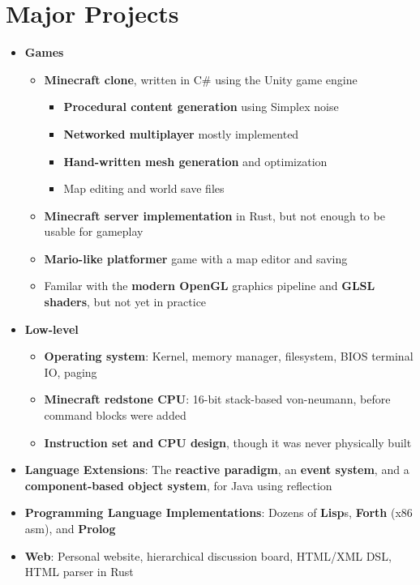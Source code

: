 \documentclass[11pt]{article}
\begin{document}
\section{Major Projects}
\begin{itemize}[noitemsep,nolistsep]
\item {\bf Games}
  \begin{itemize}[noitemsep,nolistsep]
  \item {\bf Minecraft clone}, written in C\# using the Unity game engine
    \begin{itemize}[noitemsep,nolistsep]
    \item {\bf Procedural content generation} using Simplex noise
    \item {\bf Networked multiplayer} mostly implemented
    \item {\bf Hand-written mesh generation} and optimization
    \item Map editing and world save files
    \end{itemize}
  \item {\bf Minecraft server implementation} in Rust, but not enough to be usable for gameplay
  \item {\bf Mario-like platformer} game with a map editor and saving
  \item Familar with the {\bf modern OpenGL} graphics pipeline and {\bf GLSL shaders}, but not yet in practice
  \end{itemize}
\item {\bf Low-level}
  \begin{itemize}[noitemsep,nolistsep]
  \item {\bf Operating system}: Kernel, memory manager, filesystem, BIOS terminal IO, paging
  \item {\bf Minecraft redstone CPU}: 16-bit stack-based von-neumann, before command blocks were added
  \item {\bf Instruction set and CPU design}, though it was never physically built
  \end{itemize}
\item {\bf Language Extensions}: The {\bf reactive paradigm}, an {\bf event system}, and a {\bf component-based object system}, for Java using reflection
\item {\bf Programming Language Implementations}: Dozens of {\bf Lisp}s, {\bf Forth} (x86 asm), and {\bf Prolog}
\item {\bf Web}: Personal website, hierarchical discussion board, HTML/XML DSL, HTML parser in Rust
\end{itemize}
\end{document}
